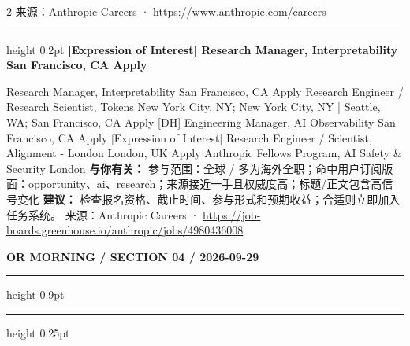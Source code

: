 \documentclass[10.5pt]{ctexart}
\begin{document}
\begin{multicols}{2}
{\footnotesize\color{ormuted} 来源：Anthropic Careers · \url{https://www.anthropic.com/careers}}
\vspace{2mm}
\hrule height 0.2pt
\vspace{2mm}
{\large\bfseries [Expression of Interest] Research Manager, Interpretability San Francisco, CA Apply}\par
[Expression of Interest] Research Manager, Interpretability San Francisco, CA Apply Research Engineer / Research Scientist, Tokens New York City, NY; New York City, NY | Seattle, WA; San Francisco, CA Apply [DH] Engineering Manager, AI Observability San Francisco, CA Apply [Expression of Interest] Research Engineer / Scientist, Alignment - London London, UK Apply Anthropic Fellows Program, AI Safety \& Security London
\textbf{与你有关：} 参与范围：全球 / 多为海外全职；命中用户订阅版面：opportunity、ai、research；来源接近一手且权威度高；标题/正文包含高信号变化
\textbf{建议：} 检查报名资格、截止时间、参与形式和预期收益；合适则立即加入任务系统。
{\footnotesize\color{ormuted} 来源：Anthropic Careers · \url{https://job-boards.greenhouse.io/anthropic/jobs/4980436008}}
\end{multicols}
\newpage
{\small\bfseries OR MORNING / SECTION 04 / 2026-09-29}
\vspace{2mm}
\hrule height 0.9pt
\vspace{1.5mm}
\hrule height 0.25pt
\vspace{4mm}
\end{document}
